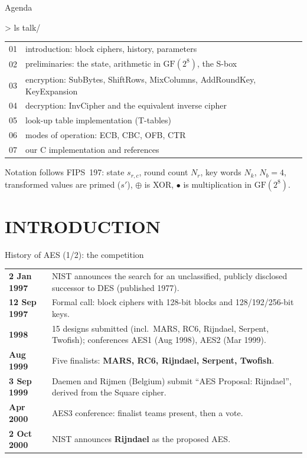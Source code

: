 \documentclass[aspectratio=169,10pt]{beamer}
\newcommand{\xor}{\oplus}
\newcommand{\gm}{\bullet}                       %
\newcommand{\GF}{\mathrm{GF}(2^8)}
\newcommand{\Nr}{N_{r}}
\newcommand{\Nk}{N_{k}}
\newcommand{\Nb}{N_{b}}
\begin{document}
\begin{frame}{Agenda}
\begin{tbox}{> ls talk/}
\small
\begin{tabular}{@{}l@{\quad}l@{}}
01 & introduction: block ciphers, history, parameters \\
02 & preliminaries: the state, arithmetic in $\GF$, the S-box \\
03 & encryption: SubBytes, ShiftRows, MixColumns, AddRoundKey, KeyExpansion \\
04 & decryption: InvCipher and the equivalent inverse cipher \\
05 & look-up table implementation (T-tables) \\
06 & modes of operation: ECB, CBC, OFB, CTR \\
07 & our C implementation and references \\
\end{tabular}
\end{tbox}
\vskip6pt
\footnotesize Notation follows FIPS~197: state $s_{r,c}$, round count $\Nr$, key words $\Nk$, $\Nb=4$,
transformed values are primed ($s'$), $\xor$ is XOR, $\gm$ is multiplication in $\GF$.
\end{frame}

\section{INTRODUCTION}

\begin{frame}{History of AES (1/2): the competition}
\footnotesize
\renewcommand{\arraystretch}{1.18}
\begin{tabular}{@{}>{\bfseries}p{2.3cm}p{9.3cm}@{}}
\toprule
2 Jan 1997 & NIST announces the search for an unclassified, publicly disclosed successor to DES (published 1977). \\
12 Sep 1997 & Formal call: block ciphers with 128-bit blocks and 128/192/256-bit keys. \\
1998 & 15 designs submitted (incl.\ MARS, RC6, Rijndael, Serpent, Twofish); conferences AES1 (Aug 1998), AES2 (Mar 1999). \\
Aug 1999 & Five finalists: \textbf{MARS, RC6, Rijndael, Serpent, Twofish}. \\
3 Sep 1999 & Daemen and Rijmen (Belgium) submit ``AES Proposal: Rijndael'', derived from the Square cipher. \\
Apr 2000 & AES3 conference: finalist teams present, then a vote. \\
2 Oct 2000 & NIST announces \textbf{Rijndael} as the proposed AES. \\
\bottomrule
\end{tabular}
\end{frame}
\end{document}
